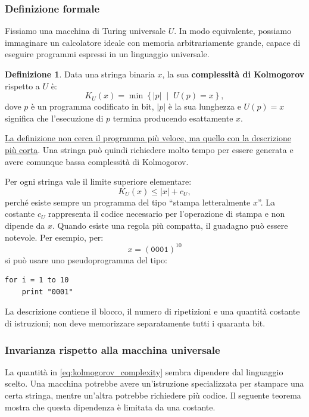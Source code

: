 \documentclass{article}
\theoremstyle{definition}
\newtheorem{definizione}{Definizione}[section]
\numberwithin{equation}{section}
\begin{document}
\subsubsection{Definizione formale}
Fissiamo una macchina di Turing universale $U$. In modo equivalente, possiamo
immaginare un calcolatore ideale con memoria arbitrariamente grande, capace di
eseguire programmi espressi in un linguaggio universale.

\begin{definizione}
    Data una stringa binaria $x$, la sua \textbf{complessità di Kolmogorov}
    rispetto a $U$ è:
    \begin{equation}\label{eq:kolmogorov_complexity}
        K_U(x)
        =
        \min\left\{
        |p|
        \;\middle|\;
        U(p)=x
        \right\},
    \end{equation}
    dove $p$ è un programma codificato in bit, $|p|$ è la sua lunghezza e
    $U(p)=x$ significa che l'esecuzione di $p$ termina producendo esattamente
    $x$.
\end{definizione}

\uline{La definizione non cerca il programma più veloce, ma quello con la descrizione
    più corta}. Una stringa può quindi richiedere molto tempo per essere generata e
avere comunque bassa complessità di Kolmogorov.

Per ogni stringa vale il limite superiore elementare:
\begin{equation}\label{eq:kolmogorov_print_bound}
    K_U(x)\leq |x|+c_U,
\end{equation}
perché esiste sempre un programma del tipo ``stampa letteralmente $x$''. La
costante $c_U$ rappresenta il codice necessario per l'operazione di stampa e
non dipende da $x$. Quando esiste una regola più compatta, il guadagno può
essere notevole. Per esempio, per:
\[
    x=(\texttt{0001})^{10}
\]
si può usare uno pseudoprogramma del tipo:
\begin{verbatim}
for i = 1 to 10
    print "0001"
\end{verbatim}
La descrizione contiene il blocco, il numero di ripetizioni e una quantità
costante di istruzioni; non deve memorizzare separatamente tutti i quaranta
bit.

\subsubsection{Invarianza rispetto alla macchina universale}
La quantità in \eqref{eq:kolmogorov_complexity} sembra dipendere dal linguaggio
scelto. Una macchina potrebbe avere un'istruzione specializzata per stampare
una certa stringa, mentre un'altra potrebbe richiedere più codice. Il seguente
teorema mostra che questa dipendenza è limitata da una costante.
\end{document}
